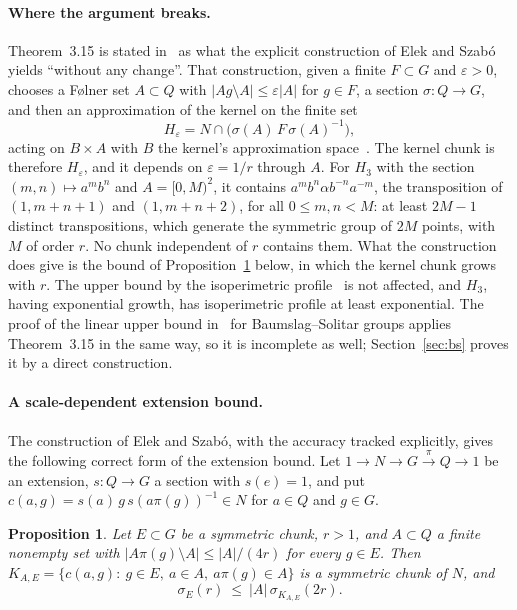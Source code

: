 \documentclass[11pt,a4paper]{article}
\theoremstyle{plain}
\newtheorem{proposition}[theorem]{Proposition}
\theoremstyle{definition}
\theoremstyle{remark}
\begin{document}
\paragraph{Where the argument breaks.} Theorem~3.15 is stated in~\cite{Cornulier2013} as what the explicit construction
of Elek and Szabó~\cite{ElekSzabo2006} yields ``without any change''. That construction, given a finite $F\subset G$ and
$\varepsilon>0$, chooses a Følner set $A\subset Q$ with $|Ag\setminus A|\le\varepsilon|A|$ for $g\in F$, a section
$\sigma:Q\to G$, and then an approximation of the kernel on the finite set
\[
H_\varepsilon=N\cap\big(\sigma(A)\,F\,\sigma(A)^{-1}\big),
\]
acting on $B\times A$ with $B$ the kernel's approximation space~\cite[proof of Theorem~1(3)]{ElekSzabo2006}. The kernel
chunk is therefore $H_\varepsilon$, and it depends on $\varepsilon=1/r$ through $A$. For $H_3$ with the section
$(m,n)\mapsto a^mb^n$ and $A=[0,M)^2$, it contains $a^mb^n\alpha b^{-n}a^{-m}$, the transposition of $(1,m+n+1)$ and
$(1,m+n+2)$, for all $0\le m,n<M$: at least $2M-1$ distinct transpositions, which generate the symmetric group of $2M$
points, with $M$ of order $r$. No chunk independent of $r$ contains them. What the construction does give is the bound of
Proposition~\ref{prop:extension} below, in which the kernel chunk grows with $r$. The upper bound by the isoperimetric
profile~\cite[Proposition~3.14]{Cornulier2013} is not affected, and $H_3$, having exponential growth, has isoperimetric profile at least
exponential. The proof of the linear upper bound in~\cite[Proposition~3.17]{Cornulier2013} for Baumslag--Solitar groups applies Theorem~3.15 in the
same way, so it is incomplete as well; Section~\ref{sec:bs} proves it by a direct construction.

\paragraph{A scale-dependent extension bound.} The construction of Elek and Szabó, with the accuracy tracked explicitly, gives the following
correct form of the extension bound. Let $1\to N\to G\xrightarrow{\pi}Q\to1$ be an extension, $s:Q\to G$ a section with $s(e)=1$, and put
$c(a,g)=s(a)\,g\,s(a\pi(g))^{-1}\in N$ for $a\in Q$ and $g\in G$.

\begin{proposition}\label{prop:extension}
Let $E\subset G$ be a symmetric chunk, $r>1$, and $A\subset Q$ a finite nonempty set with $|A\pi(g)\setminus A|\le|A|/(4r)$ for every $g\in E$. Then
$K_{A,E}=\{c(a,g):\ g\in E,\ a\in A,\ a\pi(g)\in A\}$ is a symmetric chunk of $N$, and
\[
\sigma_E(r)\ \le\ |A|\,\sigma_{K_{A,E}}(2r).
\]
\end{proposition}
\end{document}

